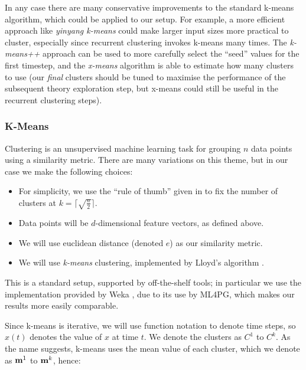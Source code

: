 In any case there are many conservative improvements to the standard k-means
algorithm, which could be applied to our setup. For example, a more efficient
approach like \emph{yinyang k-means} \cite{conf/icml/DingZSMM15} could make
larger input sizes more practical to cluster, especially since recurrent
clustering invokes k-means many times. The \emph{k-means++} approach
\cite{arthur2007k, bahmani2012scalable} can be used to more carefully select
the ``seed'' values for the first timestep, and the \emph{x-means} algorithm
\cite{pelleg2000x} is able to estimate how many clusters to use (our
\emph{final} clusters should be tuned to maximise the performance of the
subsequent theory exploration step, but x-means could still be useful in the
recurrent clustering steps).

\subsubsection{K-Means}
\label{sec:kmeans}

Clustering is an unsupervised machine learning task for grouping $n$ data points
using a similarity metric. There are many variations on this theme, but in our
case we make the following choices:

\begin{itemize}
\item For simplicity, we use the ``rule of thumb'' given in
  \cite[pp. 365]{mardia1979multivariate} to fix the number of clusters at
  $k = \lceil \sqrt{\frac{n}{2}} \rceil$.
\item Data points will be $d$-dimensional feature vectors, as defined above.
\item We will use euclidean distance (denoted $e$) as our similarity metric.
\item We will use \emph{k-means} clustering, implemented by Lloyd's algorithm
  \cite{lloyd1982least}.
\end{itemize}

This is a standard setup, supported by off-the-shelf tools; in particular we use
the implementation provided by Weka \cite{Holmes.Donkin.Witten:1994}, due to
its use by ML4PG, which makes our results more easily comparable.

Since k-means is iterative, we will use function notation to denote time steps,
so $x(t)$ denotes the value of $x$ at time $t$. We denote the clusters as $C^1$
to $C^k$. As the name suggests, k-means uses the mean value of each cluster,
which we denote as $\mathbf{m}^1$ to $\mathbf{m}^k$, hence:

